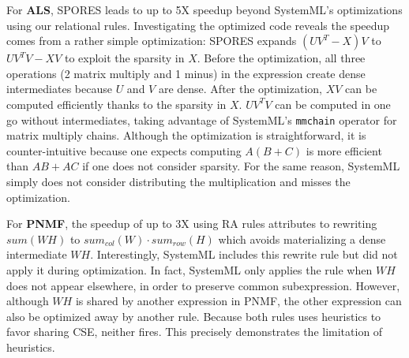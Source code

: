 



For \textbf{ALS}, SPORES leads to up to 5X speedup beyond SystemML's
optimizations using our relational rules. Investigating the optimized code
reveals the speedup comes from a rather simple optimization: SPORES expands
$(UV^T - X)V$ to $UV^TV-XV$ to exploit the sparsity in $X$. Before the optimization,
all three operations (2 matrix multiply and 1 minus) 
in the expression create dense intermediates because $U$
and $V$ are dense. After the optimization, $XV$ can be computed efficiently thanks to
the sparsity in $X$. $UV^TV$ can be computed in one go without intermediates, taking advantage of
SystemML's \texttt{mmchain} operator for matrix multiply chains. Although the
optimization is straightforward, it is counter-intuitive because one expects
computing $A(B + C)$ is more efficient than $AB + AC$ if one does not consider
sparsity. For the same reason, SystemML simply does not consider distributing
the multiplication and misses the optimization.

For \textbf{PNMF}, the speedup of up to 3X using RA rules attributes to rewriting $sum(WH)$
to $sum_{col}(W) \cdot sum_{row}(H)$ which avoids materializing a dense
intermediate $WH$. Interestingly, SystemML includes this rewrite rule but did
not apply it during optimization. In fact, SystemML only applies the rule when
$WH$ does not appear elsewhere, in order to preserve common subexpression.
However, although $WH$ is shared by another expression in PNMF, the other
expression can also be optimized away by another rule. Because both rules uses heuristics to favor sharing CSE, neither fires. 
This precisely
demonstrates the limitation of heuristics. 

